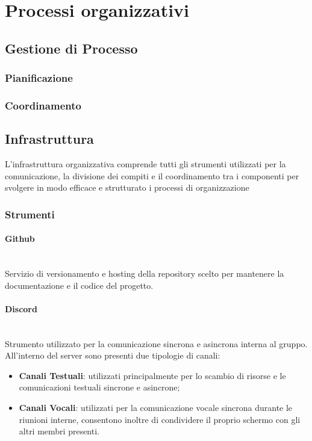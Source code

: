 \documentclass{article}
\begin{document}
\section{Processi organizzativi}

\subsection{Gestione di Processo}
    \subsubsection{Pianificazione}
    \subsubsection{Coordinamento}

\subsection{Infrastruttura}
L'infrastruttura organizzativa comprende tutti gli strumenti utilizzati per la comunicazione, la divisione dei compiti e il coordinamento tra i componenti per svolgere in modo efficace e strutturato i processi di organizzazione

\subsubsection{Strumenti}

\paragraph{Github}~\\
Servizio di versionamento e hosting della repository scelto per mantenere la documentazione e il codice del progetto.

\paragraph{Discord}~\\
Strumento utilizzato per la comunicazione sincrona e asincrona interna al gruppo. All'interno del server sono presenti due tipologie di canali:
\begin{itemize}
    \item\textbf{Canali Testuali}: utilizzati principalmente per lo scambio di risorse e le comunicazioni testuali sincrone e asincrone;
    \item\textbf{Canali Vocali}: utilizzati per la comunicazione vocale sincrona durante le riunioni interne, consentono inoltre di condividere il proprio schermo con gli altri membri presenti.
\end{itemize}
\end{document}
